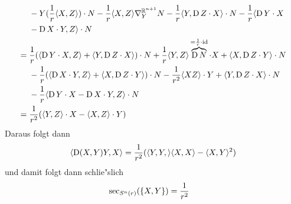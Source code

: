 \begin{Loes}
\begin{align*}
   & - Y ( \frac{1}{r} \langle X, Z \rangle ) \cdot N - \frac{1}{r} \langle X, Z \rangle \nabla_Y^{\operatorname{\mathbb{R}}^{n+1}} N - \frac{1}{r} \langle Y, \operatorname{D} Z \cdot X \rangle \cdot N - \frac{1}{r} \langle \operatorname{D} Y \cdot X\\
   & - \operatorname{D} X \cdot Y, Z \rangle \cdot N\\
={}& \frac{1}{r} ( \langle \operatorname{D} Y \cdot X, Z \rangle + \langle Y, \operatorname{D} Z \cdot X \rangle ) \cdot N + \frac{1}{r} \langle Y, Z \rangle \overbrace{\operatorname{D} N}^{= \frac{1}{r} \cdot \operatorname{id}} \cdot X + \langle X, \operatorname{D} Z \cdot Y \rangle \cdot N\\
   & - \frac{1}{r} ( \langle \operatorname{D} X \cdot Y, Z \rangle + \langle X, \operatorname{D} Z \cdot Y \rangle ) \cdot N - \frac{1}{r^2} \langle X Z \rangle \cdot Y + \langle Y, \operatorname{D} Z \cdot X \rangle \cdot N\\
   & - \frac{1}{r} \langle \operatorname{D} Y \cdot X - \operatorname{D} X \cdot Y, Z \rangle \cdot N\\
={}& \frac{1}{r^2} ( \langle Y, Z \rangle \cdot X - \langle X, Z \rangle \cdot Y)
\end{align*}
Daraus folgt dann
\begin{align*}
	\langle \operatorname{D}(X,Y) Y, X \rangle = \frac{1}{r^2} ( \langle Y, Y, \rangle \langle X, X \rangle - \langle X, Y \rangle^2)
\end{align*}
und damit folgt dann schlie"slich
\begin{align*}
\sec_{S^n(r)}(\span\{X,Y\}) = \frac{1}{r^2}
\end{align*}
\end{Loes}